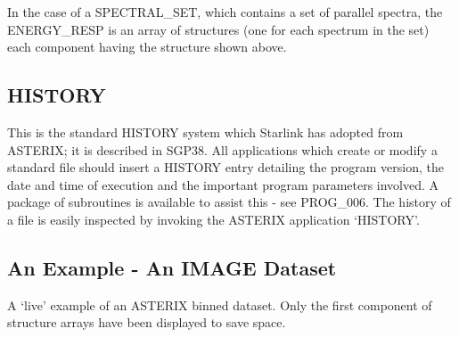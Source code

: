 In the case of a  SPECTRAL\_SET,  which  contains  a  set  of  parallel
spectra,  the  ENERGY\_RESP  is  an  array  of structures (one for each
spectrum in the set) each component having the structure shown above.

\subsection{HISTORY}

This is the standard HISTORY system which Starlink  has  adopted  from
ASTERIX;  it  is described in SGP38.  All applications which create or
modify a standard file should insert a  HISTORY  entry  detailing  the
program  version,  the  date  and  time of execution and the important
program parameters involved.  A package of subroutines is available to
assist this - see PROG\_006.  The history of a file is easily inspected
by invoking the ASTERIX application `HISTORY'.

\subsection{An Example - An IMAGE Dataset}

A `live' example  of  an  ASTERIX  binned  dataset.   Only  the  first
component of structure arrays have been displayed to save space.

